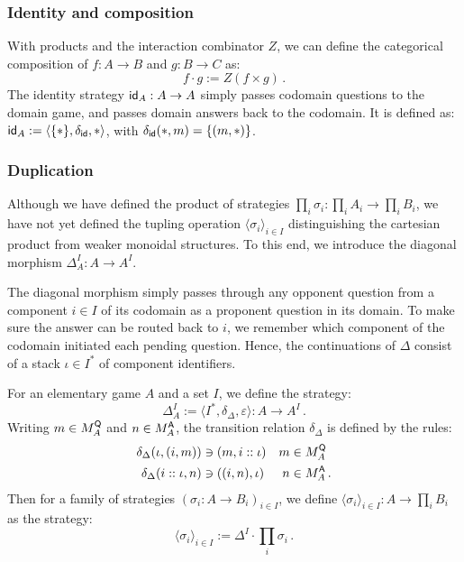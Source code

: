 
\subsubsection{Identity and composition} %

With products and the interaction combinator $Z$,
we can define the categorical composition of
$f : A \rightarrow B$ and $g : B \rightarrow C$ as:
\[
    f \cdot g := Z(f \times g) \,.
\]
The identity strategy $ \mathsf{id} _A : A \rightarrow A$
simply passes codomain questions to the domain game,
and passes domain answers back to the codomain.
It is defined as:
$ \mathsf{id} _A := \langle \{ * \}, \delta_{ \mathsf{id} }, * \rangle$,
with $\delta_{ \mathsf{id} }(*, m) = \{(m, *)\}$.


\subsubsection{Duplication} %

Although we have defined the product of strategies
$\prod_i \sigma_i : \prod_i A_i \rightarrow \prod_i B_i$,
we have not yet defined the tupling operation
$\langle \sigma_i \rangle_{i \in I}$
distinguishing the cartesian product
from weaker monoidal structures.
To this end,
we introduce the diagonal morphism
$\Delta_A^I : A \rightarrow A^I$.

The diagonal morphism simply passes through any
opponent question from a component $i \in I$ of its codomain
as a proponent question in its domain.
To make sure the answer can be routed back to $i$,
we remember which component of the codomain initiated
each pending question.
Hence,
the continuations of $\Delta$
consist of a stack $\iota \in I^*$
of component identifiers.

\begin{definition} %
For an elementary game $A$ and a set $I$,
we define the strategy:
\[ \Delta_A^I := \langle I^*, \delta_\Delta, \varepsilon \rangle
  : A \rightarrow A^I \,. \]
Writing $m \in M_A^{ \mathsf{Q} }$ and $n \in M_A^{ \mathsf{A} }$,
the transition relation $\delta_\Delta$
is defined by the rules:
\begin{align*}
  \delta_\Delta(\iota, (i, m)) &\ni (m, i :: \iota) & m &\in M_A^{ \mathsf{Q} } \\
  \delta_\Delta(i :: \iota, n) &\ni ((i, n), \iota) & n &\in M_A^{ \mathsf{A} } \,.
\end{align*}
Then for a family of strategies $(\sigma_i : A \rightarrow B_i)_{i \in I}$,
we define
$\langle \sigma_i \rangle_{i \in I} : A \rightarrow \prod_i B_i$
as the strategy:
\[
    \langle \sigma_i \rangle_{i \in I} := 
      \Delta^I \cdot \prod_i \sigma_i \,.
\]
\end{definition}

